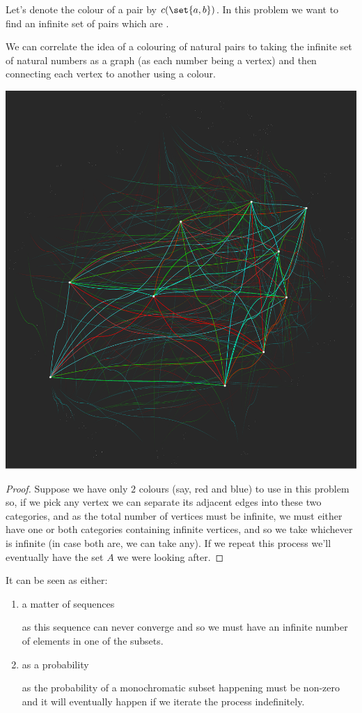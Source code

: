 \documentclass[english, dark, index]{Iart}
\begin{document}
	Let's denote the colour of a pair by $ c(\set{a,b}) $. In this problem we want to find an infinite set of pairs which are .
	
	We can correlate the idea of a colouring of natural pairs to taking the infinite set of natural numbers as a graph (as each number being a vertex) and then connecting each vertex to another using a colour.
	
	\begin{ruledfig}
		\includegraphics[width=\linewidth]{figRandom.pdf}
	\end{ruledfig}
	
	\begin{proof}
		Suppose we have only $ 2 $ colours (say, red and blue) to use in this problem so, if we pick any vertex we can separate its adjacent edges into these two categories, and as the total number of vertices must be infinite, we must either have one or both categories containing infinite vertices, and so we take whichever is infinite (in case both are, we can take any). If we repeat this process we'll eventually have the set $ A $ we were looking after.
	\end{proof}

	It can be seen as either:
	\begin{enumerate}
		\item a matter of sequences
		
		as this sequence can never converge and so we must have an infinite number of elements in one of the subsets.
		\item as a probability
		
		as the probability of a monochromatic subset happening must be non-zero and it will eventually happen if we iterate the process indefinitely.
	\end{enumerate}
	
\end{document}
